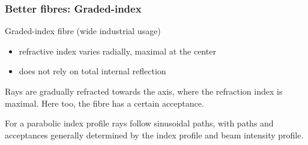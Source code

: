 \begin{frame}
  \frametitle{Better fibres: Graded-index}

  Graded-index fibre (wide industrial usage)
  \begin{itemize}
  \item refractive index varies radially, maximal at the center
  \item does not rely on total internal reflection
  \end{itemize}
  Rays are gradually refracted towards the axis, where the refraction
  index is maximal. Here too, the fibre has a certain acceptance.

  \begin{center}
  \end{center}
  For a parabolic index profile rays follow sinusoidal paths, with
  paths and acceptances generally determined by the index profile and
  beam intensity profile.

\end{frame}


